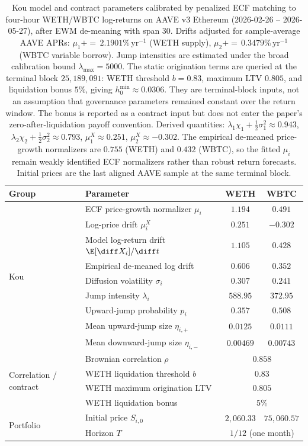 \begin{table}[ht]
\centering
\renewcommand{\arraystretch}{1.3}
\begin{tabular}{llcc}
\toprule
Group & Parameter & WETH & WBTC \\
\midrule
\multirow{9}{*}{Kou}
 & ECF price-growth normalizer $\mu_i$ & $1.194$ & $0.491$ \\
 & Log-price drift $\mu_i^X$ & $0.251$ & $-0.302$ \\
 & Model log-return drift $\E[\diff X_i]/\diff t$ & $1.105$ & $0.428$ \\
 & Empirical de-meaned log drift & $0.606$ & $0.352$ \\
 & Diffusion volatility $\sigma_i$ & $0.307$ & $0.241$ \\
 & Jump intensity $\lambda_i$ & $588.95$ & $372.95$ \\
 & Upward-jump probability $p_i$ & $0.357$ & $0.508$ \\
 & Mean upward-jump size $\eta_{i,+}$ & $0.0125$ & $0.0111$ \\
 & Mean downward-jump size $\eta_{i,-}$ & $0.00469$ & $0.00743$ \\
\midrule
\multirow{4}{*}{Correlation / contract}
 & Brownian correlation $\rho$ & \multicolumn{2}{c}{$0.858$} \\
 & WETH liquidation threshold $b$ & \multicolumn{2}{c}{$0.83$} \\
 & WETH maximum origination LTV & \multicolumn{2}{c}{$0.805$} \\
 & WETH liquidation bonus & \multicolumn{2}{c}{$5\%$} \\
\midrule
\multirow{2}{*}{Portfolio}
 & Initial price $S_{i,0}$ & $2{,}060.33$ & $75{,}060.57$ \\
 & Horizon $T$ & \multicolumn{2}{c}{$1/12$ (one month)} \\
\bottomrule
\end{tabular}
\caption{Kou model and contract parameters calibrated by penalized ECF matching to four-hour
WETH/WBTC log-returns on AAVE v3 Ethereum
(2026-02-26 -- 2026-05-27), after EWM de-meaning with span 30. Drifts adjusted
for sample-average AAVE APRs: $\mu_1 {+}{=}\, 2.1901\%\,\mathrm{yr}^{-1}$ (WETH supply),
$\mu_2 {+}{=}\, 0.3479\%\,\mathrm{yr}^{-1}$ (WBTC variable borrow). Jump intensities are
estimated under the broad calibration bound $\lambda_{\max}=5000$.
The static origination terms are queried at the terminal block $25{,}189{,}091$:
WETH threshold $b=0.83$, maximum LTV $0.805$, and liquidation bonus $5\%$, giving
$h_0^{\min}\approx0.0306$. They are terminal-block inputs, not an assumption that
governance parameters remained constant over the return window. The bonus is reported as
a contract input but does not enter the paper's zero-after-liquidation payoff convention.
Derived quantities:
$\lambda_1\chi_1+\tfrac12\sigma_1^2\approx0.943$,
$\lambda_2\chi_2+\tfrac12\sigma_2^2\approx0.793$,
$\mu_1^X\approx0.251$, $\mu_2^X\approx-0.302$. The empirical de-meaned
price-growth normalizers are $0.755$ (WETH) and $0.432$ (WBTC), so the fitted
$\mu_i$ remain weakly identified ECF normalizers rather than robust return forecasts.
Initial prices are the last aligned AAVE sample at the same terminal block.}
\label{tab:num-params}
\end{table}

